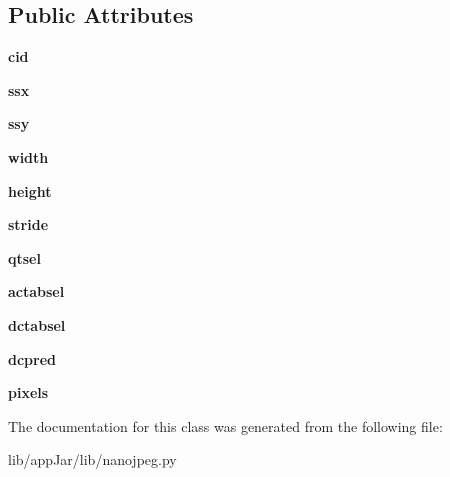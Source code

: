 \subsection*{Public Attributes}
\begin{DoxyCompactItemize}
\item 
\mbox{\label{classlib_1_1nanojpeg_1_1nj__component__t_adf3d30f1ec345c0f6fdb578db23acaab}} 
{\bfseries cid}
\item 
\mbox{\label{classlib_1_1nanojpeg_1_1nj__component__t_a4056cbb4e37619ea9a9f717785b99958}} 
{\bfseries ssx}
\item 
\mbox{\label{classlib_1_1nanojpeg_1_1nj__component__t_a7c067c01b786dcfd5f9809d62cbdc744}} 
{\bfseries ssy}
\item 
\mbox{\label{classlib_1_1nanojpeg_1_1nj__component__t_af3157311f38d651538f775d7e1771ba2}} 
{\bfseries width}
\item 
\mbox{\label{classlib_1_1nanojpeg_1_1nj__component__t_a88be2596cb9104a02f94de4d6221c4d0}} 
{\bfseries height}
\item 
\mbox{\label{classlib_1_1nanojpeg_1_1nj__component__t_a2998296e28f5a78148ba0489ec160800}} 
{\bfseries stride}
\item 
\mbox{\label{classlib_1_1nanojpeg_1_1nj__component__t_a68b25584ceafbe842a9be2a08c9ccfc9}} 
{\bfseries qtsel}
\item 
\mbox{\label{classlib_1_1nanojpeg_1_1nj__component__t_af2ac8dba69794af291cc58154508854a}} 
{\bfseries actabsel}
\item 
\mbox{\label{classlib_1_1nanojpeg_1_1nj__component__t_a9870cc03330550e7f4181742648fac8d}} 
{\bfseries dctabsel}
\item 
\mbox{\label{classlib_1_1nanojpeg_1_1nj__component__t_a5fd8b1bfa662ca1b211b7501045db6f8}} 
{\bfseries dcpred}
\item 
\mbox{\label{classlib_1_1nanojpeg_1_1nj__component__t_a3e6f096fef0dabad7b74c544bc191046}} 
{\bfseries pixels}
\end{DoxyCompactItemize}


The documentation for this class was generated from the following file\+:\begin{DoxyCompactItemize}
\item 
lib/app\+Jar/lib/nanojpeg.\+py\end{DoxyCompactItemize}
